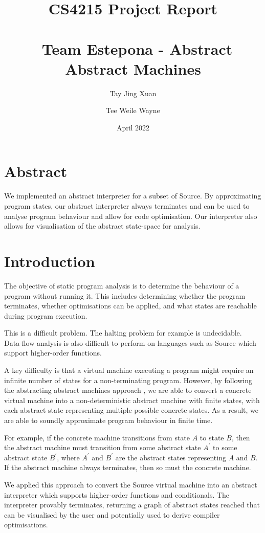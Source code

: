 \documentclass[12pt]{article}
\title{CS4215 Project Report \\\ \\\
Team Estepona - Abstract Abstract Machines}
\author{Tay Jing Xuan \and Tee Weile Wayne}
\date{April 2022}
\begin{document}
\maketitle

\section{Abstract}
We implemented an abstract interpreter for a subset of Source. By approximating program states, our abstract interpreter always terminates and can be used to analyse program behaviour and allow for code optimisation. Our interpreter also allows for visualisation of the abstract state-space for analysis.

\section{Introduction}
The objective of static program analysis is to determine the behaviour of a program without running it. This includes determining whether the program terminates, whether optimisations can be applied, and what states are reachable during program execution.

This is a difficult problem. The halting problem for example is undecidable. Data-flow analysis is also difficult to perform on languages such as Source which support higher-order functions.

A key difficulty is that a virtual machine executing a program might require an infinite number of states for a non-terminating program. However, by following the abstracting abstract machines approach \cite{aam}, we are able to convert a concrete virtual machine into a non-deterministic abstract machine with finite states, with each abstract state representing multiple possible concrete states. As a result, we are able to soundly approximate program behaviour in finite time.

For example, if the concrete machine transitions from state $A$ to state $B$, then the abstract machine must transition from some abstract state $A^{\prime}$ to some abstract state $B^{\prime}$, where $A^{\prime}$ and $B^{\prime}$ are the abstract states representing $A$ and $B$. If the abstract machine always terminates, then so must the concrete machine.

We applied this approach to convert the Source virtual machine into an abstract interpreter which supports higher-order functions and conditionals. The interpreter provably terminates, returning a graph of abstract states reached that can be visualised by the user and potentially used to derive compiler optimisations.
\end{document}

